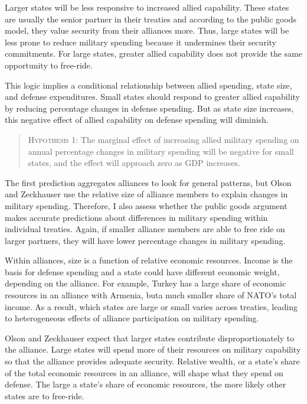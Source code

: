 \documentclass[12pt]{article}
\begin{document}
 
Larger states will be less responsive to increased allied capability. 
These states are usually the senior partner in their treaties and according to the public goods model, they value security from their alliances more. 
Thus, large states will be less prone to reduce military spending because it undermines their security commitments. 
For large states, greater allied capability does not provide the same opportunity to free-ride.


This logic implies a conditional relationship between allied spending, state size, and defense expenditures. 
Small states should respond to greater allied capability by reducing percentage changes in defense spending. 
But as state size increases, this negative effect of allied capability on defense spending will diminish. 


\begin{quote}
\textsc{Hypothesis 1}: The marginal effect of increasing allied military spending on annual percentage changes in military spending will be negative for small states, and the effect will approach zero as GDP increases. 
\end{quote}


The first prediction aggregates alliances to look for general patterns, but Olson and Zeckhauser use the relative size of alliance members to explain changes in military spending. 
Therefore, I also assess whether the public goods argument makes accurate predictions about differences in military spending within individual treaties. 
Again, if smaller alliance members are able to free ride on larger partners, they will have lower percentage changes in military spending.  

 
Within alliances, size is a function of relative economic resources.
Income is the basis for defense spending and a state could have different economic weight, depending on the alliance. 
For example, Turkey has a large share of economic resources in an alliance with Armenia, buta much smaller share of NATO's total income. 
As a result, which states are large or small varies across treaties, leading to heterogeneous effects of alliance participation on military spending. 


Olson and Zeckhauser expect that larger states contribute disproportionately to the alliance. 
Large states will spend more of their resources on military capability so that the alliance provides adequate security. 
Relative wealth, or a state's share of the total economic resources in an alliance, will shape what they spend on defense. 
The large a state's share of economic resources, the more likely other states are to free-ride. 
\end{document}
